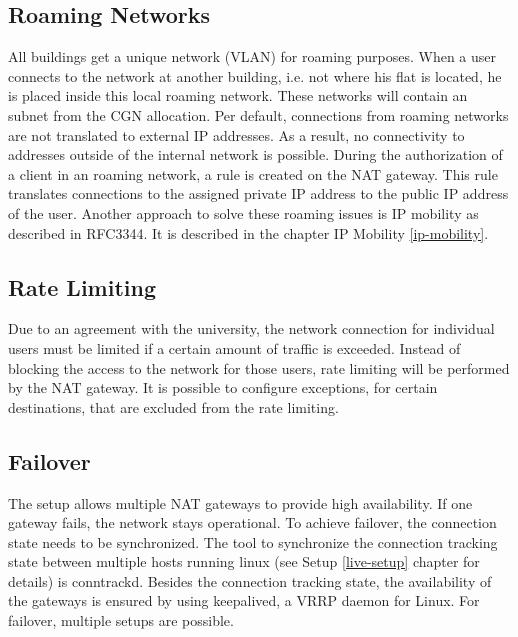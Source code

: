 \documentclass{report}
\begin{document}
\subsection{Roaming Networks}\label{roaming-networks}

All buildings get a unique network (VLAN) for roaming purposes. When a user connects to the network
at another building, i.e. not where his flat is located, he is placed inside
this local roaming network. These networks will contain an subnet from
the CGN allocation. Per default, connections from roaming networks are
not translated to external IP addresses. As a result, no connectivity to
addresses outside of the internal network is possible. During the
authorization of a client in an roaming network, a rule is created on
the NAT gateway. This rule translates connections to the assigned
private IP address to the public IP address of the user. Another approach to solve these
roaming issues is IP mobility as described in RFC3344\cite{IPMob}. It is described in the chapter IP Mobility \ref{ip-mobility}.



\subsection{Rate Limiting}\label{rate-limiting}

Due to an agreement with the university, the network connection for
individual users must be limited if a certain amount of traffic is
exceeded. Instead of blocking the access to the network for those users,
rate limiting will be performed by the NAT gateway. It is possible to 
configure exceptions, for certain destinations, that are excluded from the rate limiting.


\subsection{Failover}\label{failover}

The setup allows multiple NAT gateways to provide high availability. If one
gateway fails, the network stays operational. To achieve failover,
the connection state needs to be synchronized. The tool to synchronize
the connection tracking state between multiple hosts running linux (see Setup \ref{live-setup} chapter for details) is
conntrackd\cite{conntrack-tools}. Besides the connection tracking state, the availability
of the gateways is ensured by using keepalived\cite{keepalived}, a VRRP daemon for Linux.
For failover, multiple setups are possible.
\end{document}
